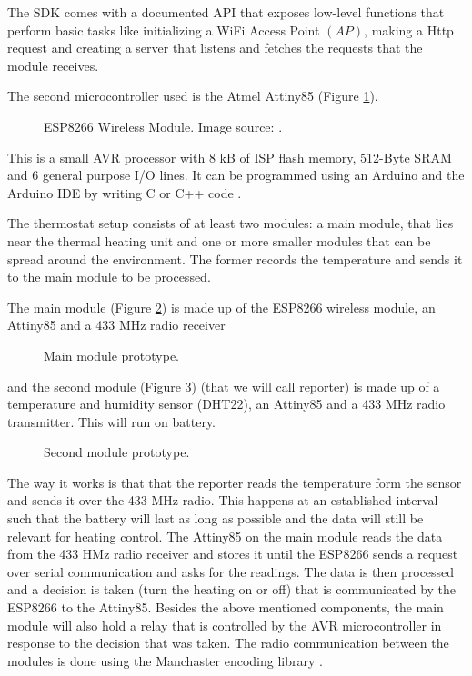 \documentclass[conference]{IEEEtran}
\begin{document}
The SDK comes with a documented API that exposes low-level functions that perform basic tasks like initializing
a WiFi Access Point $(AP)$, making a Http request and creating a server that listens and fetches the requests
that the module receives.

The second microcontroller used is the Atmel Attiny85 (Figure \ref{fig:attiny85}). \cite{website:attiny85}

\begin{figure}[h!]
\label{fig:attiny85}
\centerline{}
      \caption[attiny85]{ESP8266 Wireless Module. Image source: \cite{website:esppicture}.}
\label{fig:attiny85}
\end{figure}

This is a small AVR processor with 8 kB of ISP flash memory, 512-Byte SRAM and 6 general purpose I/O lines.
It can be programmed using an Arduino and the Arduino IDE by writing C or C++ code \cite{website:attiny85program}.

The thermostat setup consists of at least two modules: a main module, that lies near the thermal heating unit
and one or more smaller modules that can be spread around the environment. The former records the temperature
and sends it to the main module to be processed.

The main module (Figure \ref{fig:first_module}) is made up of the ESP8266 wireless module, an Attiny85 and a
433 MHz radio receiver

\begin{figure}[h!]
\label{fig:first_module}
\centerline{}
      \caption[MainModule]{Main module prototype.}
\label{fig:first_module}
\end{figure}

and the second module (Figure \ref{fig:second_module}) (that we will call reporter) is made up of a temperature and humidity sensor (DHT22), an
Attiny85 and a 433 MHz radio transmitter. This will run on battery.

\begin{figure}[h!]
\label{fig:nn}
\centerline{}
      \caption[MainModule]{Second module prototype.}
\label{fig:second_module}
\end{figure}

The way it works is that that the reporter reads the temperature form the sensor and sends it over the 433 MHz
radio. This happens at an established interval such that the battery will last as long as possible
and the data will still be relevant for heating control. The Attiny85 on the main module reads the data
from the 433 HMz radio receiver and stores it until the ESP8266 sends a request over serial communication and asks
for the readings. The data is then processed and a decision is taken (turn the heating on or off) that is
communicated by the ESP8266 to the Attiny85. Besides the above mentioned components, the main module will
also hold a relay that is controlled by the AVR microcontroller in response to the decision that was taken.
The radio communication between the modules is done using the Manchaster encoding library
\cite{website:manchester}.
\end{document}
